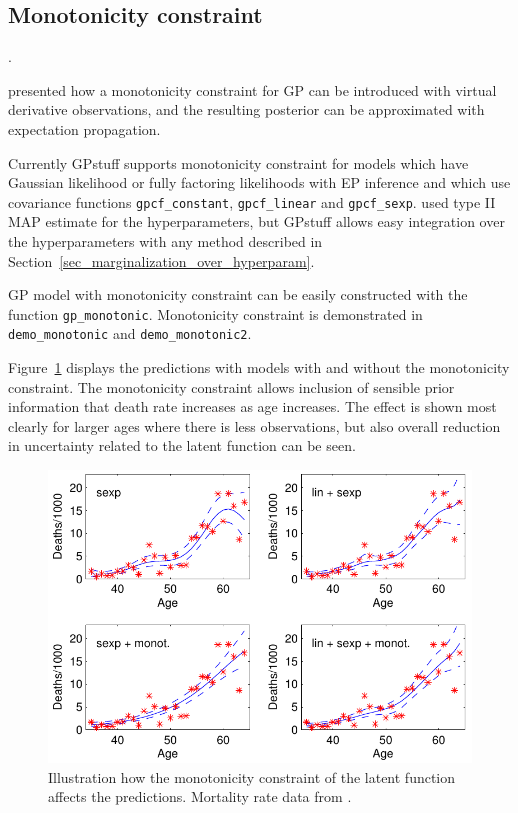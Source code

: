 \documentclass[twoside,11pt]{article}
\newcommand{\code}[1]{{\normalfont\texttt{#1}}}
\begin{document}
\subsection{Monotonicity constraint}
\label{sec_monotonic}.

\citet{Riihimaki+Vehtari:2010} presented how a monotonicity constraint
for GP can be introduced with virtual derivative observations, and
the resulting posterior can be approximated with expectation
propagation.

Currently GPstuff supports monotonicity constraint for models which
have Gaussian likelihood or fully factoring likelihoods with EP
inference and which use covariance functions \code{gpcf\_constant},
\code{gpcf\_linear} and
\code{gpcf\_sexp}. \citet{Riihimaki+Vehtari:2010} used type II MAP
estimate for the hyperparameters, but GPstuff allows easy integration
over the hyperparameters with any method described in
Section~\ref{sec_marginalization_over_hyperparam}.

GP model with monotonicity constraint can be easily constructed with
the function \code{gp\_monotonic}. Monotonicity constraint is
demonstrated in \code{demo\_monotonic} and \code{demo\_monotonic2}.

Figure~\ref{monotonicity} displays the predictions with models with
and without the monotonicity constraint. The monotonicity constraint
allows inclusion of sensible prior information that death rate
increases as age increases. The effect is shown most clearly for
larger ages where there is less observations, but also overall reduction in
uncertainty related to the latent function can be seen.

\begin{figure}
  \begin{center}       
      \includegraphics[]{demo_monotonic2_fig1.pdf}  
    \end{center}\caption{Illustration how the monotonicity constraint
      of the latent function affects the predictions. Mortality rate
      data from \citet{Broffitt:1988}.}
  \label{monotonicity} 
\end{figure}
\end{document}
